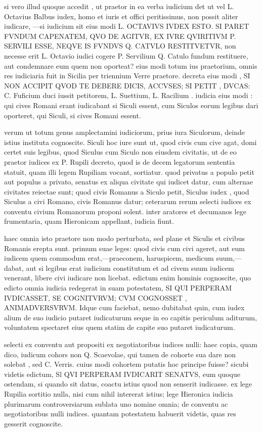  si vero illud quoque accedit , ut praetor in ea verba iudicium det ut vel L. Octavius Balbus iudex, homo et iuris et offici peritissimus, non possit aliter iudicare, —si iudicium sit eius modi L. OCTAVIVS IVDEX ESTO. SI PARET FVNDUM CAPENATEM, QVO DE AGITVR, EX IVRE QVIRITIVM P. SERVILI ESSE, NEQVE IS FVNDVS Q. CATVLO RESTITVETVR, non necesse erit L. Octavio iudici cogere P. Servilium Q. Catulo fundum restituere, aut condemnare eum quem non oporteat? eius modi totum ius praetorium, omnis res iudiciaria fuit in Sicilia per triennium Verre praetore. decreta eius modi , SI NON ACCIPIT QVOD TE DEBERE DICIS, ACCVSES; SI PETIT , DVCAS: C. Fuficium duci iussit petitorem, L. Suettium, L. Racilium . iudicia eius modi : qui cives Romani erant iudicabant si Siculi essent, cum Siculos eorum legibus dari oporteret, qui Siculi, si cives Romani essent.

 verum ut totum genus amplectamini iudiciorum, prius iura Siculorum, deinde istius instituta cognoscite. Siculi hoc iure sunt ut, quod civis cum cive agat, domi certet suis legibus, quod Siculus cum Siculo non eiusdem civitatis, ut de eo praetor iudices ex P. Rupili decreto, quod is de decem legatorum sententia statuit, quam illi legem Rupiliam vocant, sortiatur. quod privatus a populo petit aut populus a privato, senatus ex aliqua civitate qui iudicet datur, cum alternae civitates reiectae sunt; quod civis Romanus a Siculo petit, Siculus iudex , quod Siculus a civi Romano, civis Romanus datur; ceterarum rerum selecti iudices ex conventu civium Romanorum proponi solent. inter aratores et decumanos lege frumentaria, quam Hieronicam appellant, iudicia fiunt.

 haec omnia isto praetore non modo perturbata, sed plane et Siculis et civibus Romanis erepta sunt. primum suae leges: quod civis cum civi ageret, aut eum iudicem quem commodum erat,—praeconem, haruspicem, medicum suum,—dabat, aut si legibus erat iudicium constitutum et ad civem suum iudicem venerant, libere civi iudicare non licebat. edictum enim hominis cognoscite, quo edicto omnia iudicia redegerat in suam potestatem, SI QUI PERPERAM IVDICASSET, SE COGNITVRVM; CVM COGNOSSET , ANIMADVERSVRVM. Idque cum faciebat, nemo dubitabat quin, cum iudex alium de suo iudicio putaret iudicaturum seque in eo capitis periculum aditurum, voluntatem spectaret eius quem statim de capite suo putaret iudicaturum.

 selecti ex conventu aut propositi ex negotiatoribus iudices nulli: haec copia, quam dico, iudicum cohors non Q. Scaevolae, qui tamen de cohorte sua dare non solebat , sed C. Verris. cuius modi cohortem putatis hoc principe fuisse? sicubi videtis edictum, Sl QVI PERPERAM IVDICARIT SENATVS, eum quoque ostendam, si quando sit datus, coactu istius quod non senserit iudicasse. ex lege Rupilia sortitio nulla, nisi cum nihil intererat istius; lege Hieronica iudicia plurimarum controversiarum sublata uno nomine omnia; de conventu ac negotiatoribus nulli iudices. quantam potestatem habuerit videtis, quas res gesserit cognoscite.

